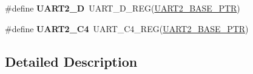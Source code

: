 \begin{DoxyCompactItemize}
\item 
\mbox{\label{group___u_a_r_t___register___accessor___macros_ga92cfdefa4bbd5e6aceaad280e911b76b}} 
\#define {\bfseries U\+A\+R\+T2\+\_\+D}~U\+A\+R\+T\+\_\+\+D\+\_\+\+R\+EG(\hyperlink{group___u_a_r_t___peripheral_ga75ca2ea4e490b3c1c7aa55fc9c25cd37}{U\+A\+R\+T2\+\_\+\+B\+A\+S\+E\+\_\+\+P\+TR})
\item 
\mbox{\label{group___u_a_r_t___register___accessor___macros_gae087e956683e43bc1a108d3a71bd2c5c}} 
\#define {\bfseries U\+A\+R\+T2\+\_\+\+C4}~U\+A\+R\+T\+\_\+\+C4\+\_\+\+R\+EG(\hyperlink{group___u_a_r_t___peripheral_ga75ca2ea4e490b3c1c7aa55fc9c25cd37}{U\+A\+R\+T2\+\_\+\+B\+A\+S\+E\+\_\+\+P\+TR})
\end{DoxyCompactItemize}


\subsection{Detailed Description}
